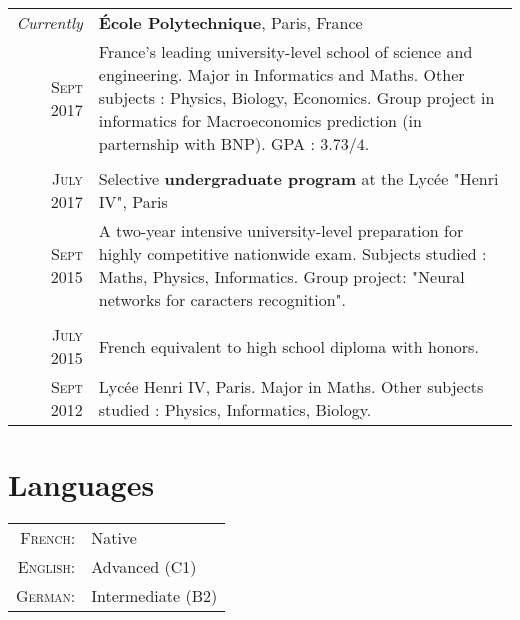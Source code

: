 \documentclass[a4paper,10pt]{article} %
\begin{document}
\begin{tabularx}{\linewidth}{r|X}
\emph{Currently} & {\large \textbf{École Polytechnique}, Paris, France }\\
\textsc{Sept} 2017 & \small{France’s leading university-level school of science and engineering.
Major in Informatics and Maths. Other subjects : Physics, Biology, Economics.
Group project in informatics for Macroeconomics prediction (in parternship with BNP).
GPA : $3.73/4$.}
\\ & \\

\textsc{July 2017} & {\large Selective \textbf{undergraduate program} at the Lycée "Henri IV", Paris}\\
\textsc{Sept 2015} & \small{A two-year intensive university-level preparation for highly competitive nationwide exam.
Subjects studied : Maths, Physics, Informatics. Group project: "Neural networks for caracters recognition".}
\\&\\

\textsc{July 2015} & {French equivalent to high school diploma with honors.}\\
\textsc{Sept 2012} & \small{Lycée Henri IV, Paris.
Major in Maths. Other subjects studied : Physics, Informatics, Biology.}
\end{tabularx}


\section{Languages}

\begin{tabular}{rl}
  \textsc{French:} & Native \\
  \textsc{English:} & Advanced (C1)\\
  \textsc{German:} & Intermediate (B2)\\
\end{tabular}

\end{document}
